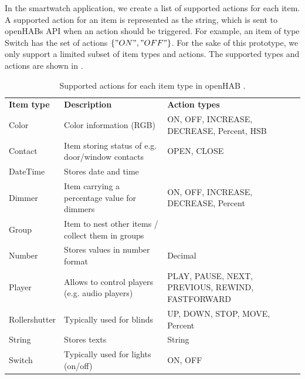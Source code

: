 In the smartwatch application, we create a list of supported actions for each item. A supported action for an item is represented as the string, which is sent to openHABs API when an action should be triggered. For example, an item of type Switch has the set of actions $\{ "ON", "OFF" \}$. For the sake of this prototype, we only support a limited subset of item types and actions. The supported types and actions are shown in .

\begin{table}[]
\centering
\caption{Supported actions for each item type in openHAB \cite{eclipse:smarthomeitems}.}
\label{tbl:design:communication-with-openhab:types}
\begin{tabular}{p{2cm}p{6cm}p{6cm}}
\textbf{Item type} & \textbf{Description}                              & \textbf{Action types}                      \\ 
Color              & Color information (RGB)                           & ON, OFF, INCREASE, DECREASE, Percent, HSB      \\
Contact            & Item storing status of e.g. door/window contacts  & OPEN, CLOSE                                  \\
DateTime           & Stores date and time                              &                                            \\
Dimmer             & Item carrying a percentage value for dimmers      & ON, OFF, INCREASE, DECREASE, Percent           \\
Group              & Item to nest other items / collect them in groups &                                            \\
Number             & Stores values in number format                    & Decimal                                    \\
Player             & Allows to control players (e.g. audio players)    & PLAY, PAUSE, NEXT, PREVIOUS, REWIND, FASTFORWARD \\
Rollershutter      & Typically used for blinds                         & UP, DOWN, STOP, MOVE, Percent                  \\
String             & Stores texts                                      & String                                     \\
Switch             & Typically used for lights (on/off)                & ON, OFF                                     
\end{tabular}
\end{table}

